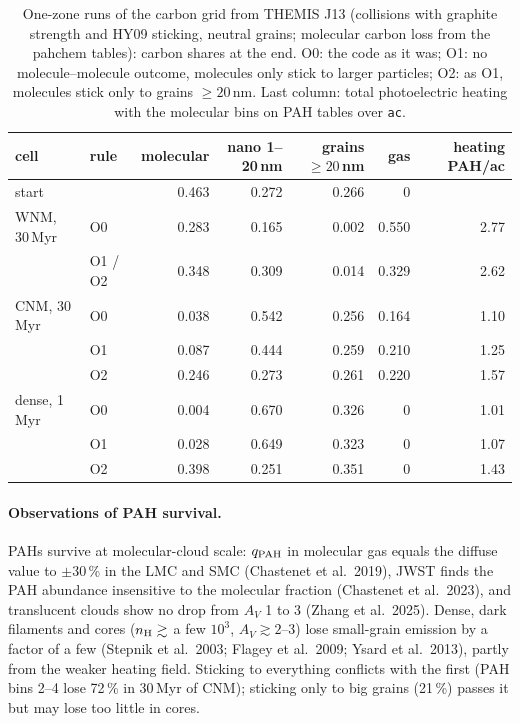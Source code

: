 \documentclass[11pt,a4paper]{article}
\begin{document}
\begin{table}[H]
\centering\small
\caption{One-zone runs of the carbon grid from THEMIS J13 (collisions with graphite strength and HY09 sticking, neutral
grains; molecular carbon loss from the pahchem tables): carbon shares at the end. O0: the code as it was; O1: no
molecule--molecule outcome, molecules only stick to larger particles; O2: as O1, molecules stick only to grains
$\ge20$\,nm. Last column: total photoelectric heating with the molecular bins on PAH tables over \texttt{ac}.}\label{tab:transfer}
\begin{tabular}{@{}l l r r r r r@{}}
\toprule
cell & rule & molecular & nano 1--20\,nm & grains $\ge20$\,nm & gas & heating PAH/ac \\
\midrule
start & & 0.463 & 0.272 & 0.266 & 0 & \\
WNM, 30\,Myr & O0 & 0.283 & 0.165 & 0.002 & 0.550 & 2.77 \\
 & O1 / O2 & 0.348 & 0.309 & 0.014 & 0.329 & 2.62 \\
CNM, 30\,Myr & O0 & 0.038 & 0.542 & 0.256 & 0.164 & 1.10 \\
 & O1 & 0.087 & 0.444 & 0.259 & 0.210 & 1.25 \\
 & O2 & 0.246 & 0.273 & 0.261 & 0.220 & 1.57 \\
dense, 1\,Myr & O0 & 0.004 & 0.670 & 0.326 & 0 & 1.01 \\
 & O1 & 0.028 & 0.649 & 0.323 & 0 & 1.07 \\
 & O2 & 0.398 & 0.251 & 0.351 & 0 & 1.43 \\
\bottomrule
\end{tabular}
\end{table}

\paragraph{Observations of PAH survival.} PAHs survive at molecular-cloud scale: $q_{\rm PAH}$ in molecular gas equals
the diffuse value to $\pm30$\,\% in the LMC and SMC (Chastenet et al.\ 2019), JWST finds the PAH abundance insensitive to
the molecular fraction (Chastenet et al.\ 2023), and translucent clouds show no drop from $A_V$ 1 to 3 (Zhang et al.\
2025). Dense, dark filaments and cores ($n_{\rm H}\gtrsim$ a few $10^3$, $A_V\gtrsim2$--3) lose small-grain emission by a
factor of a few (Stepnik et al.\ 2003; Flagey et al.\ 2009; Ysard et al.\ 2013), partly from the weaker heating field.
Sticking to everything conflicts with the first (PAH bins 2--4 lose 72\,\% in 30\,Myr of CNM); sticking only to big
grains (21\,\%) passes it but may lose too little in cores.
\end{document}
